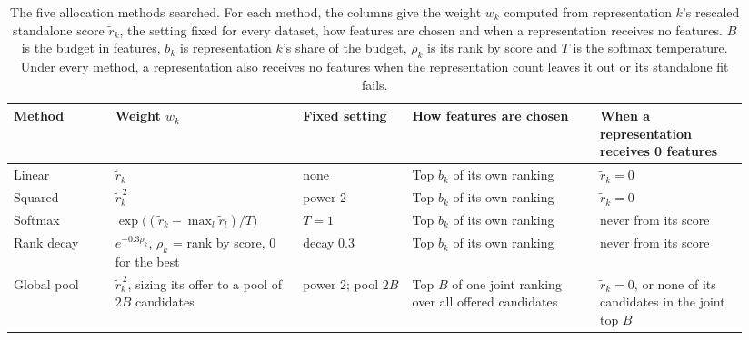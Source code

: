 \begin{table}[htbp]
\centering
\small
\begin{adjustbox}{max width=\textwidth}
\begin{tabular}{@{}P{0.13\linewidth}P{0.24\linewidth}P{0.14\linewidth}P{0.24\linewidth}P{0.19\linewidth}@{}}
\toprule
Method & Weight $w_k$ & Fixed setting & How features are chosen & When a representation receives 0 features \\
\midrule
Linear & $\tilde r_k$ & none & Top $b_k$ of its own ranking & $\tilde r_k = 0$ \\
Squared & $\tilde r_k^{\,2}$ & power 2 & Top $b_k$ of its own ranking & $\tilde r_k = 0$ \\
Softmax & $\exp\big((\tilde r_k - \max_l \tilde r_l)/T\big)$ & $T = 1$ & Top $b_k$ of its own ranking & never from its score \\
Rank decay & $e^{-0.3\rho_k}$, $\rho_k$ = rank by score, 0 for the best & decay 0.3 & Top $b_k$ of its own ranking & never from its score \\
Global pool & $\tilde r_k^{\,2}$, sizing its offer to a pool of $2B$ candidates & power 2; pool $2B$ & Top $B$ of one joint ranking over all offered candidates & $\tilde r_k = 0$, or none of its candidates in the joint top $B$ \\
\bottomrule
\end{tabular}
\end{adjustbox}
\caption[The five allocation methods searched.]{The five allocation methods searched. For each method, the columns give the weight $w_k$ computed from representation $k$'s rescaled standalone score $\tilde r_k$, the setting fixed for every dataset, how features are chosen and when a representation receives no features. $B$ is the budget in features, $b_k$ is representation $k$'s share of the budget, $\rho_k$ is its rank by score and $T$ is the softmax temperature. Under every method, a representation also receives no features when the representation count leaves it out or its standalone fit fails.}
\label{tab:alloc_methods}
\end{table}

